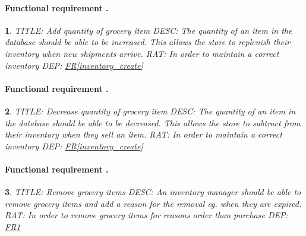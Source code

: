 \documentclass{scrreprt}
\newcounter{funcreq}
\theoremstyle{funreq}
\newtheorem{funreq}{}
\newcommand*{\reqref}[1]{\hyperref[#1]{FR\ref*{#1}}}
\begin{document}
	\paragraph[]{Functional requirement .}
	\begin{funreq}
		\label{inventory_increasenumber}
		TITLE: Add quantity of grocery item
		DESC: The quantity of an item in the database should be able to be increased.  This allows the store to replenish their inventory when new shipments arrive.
		RAT: In order to maintain a correct inventory
		DEP: \reqref{inventory_create}
	\end{funreq}

	\paragraph[]{Functional requirement .}
	\begin{funreq}
		\label{inventory_decreasenumber}
		TITLE: Decrease quantity of grocery item
		DESC: The quantity of an item in the database should be able to be decreased.  This allows the store to subtract from their inventory when they sell an item.
		RAT: In order to maintain a correct inventory
		DEP: \reqref{inventory_create}
	\end{funreq}
	
	\paragraph[]{Functional requirement .}
	\begin{funreq}
		
		\label{inventory_remove}
		TITLE: Remove grocery items
		DESC: An inventory manager should be able to remove grocery items and add a reason for the removal eg. when they are expired.
		RAT: In order to remove grocery items for reasons order than purchase
		DEP: \reqref{inventory_increasenumber}
	\end{funreq}




	
\end{document}
